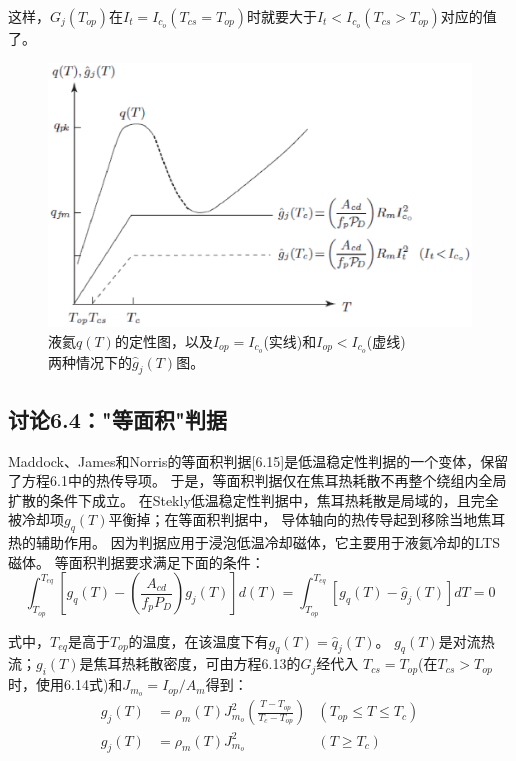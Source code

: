 这样，$G_j(T_{op})$在$I_t=I_{c_o}(T_{cs}=T_{op})$时就要大于$I_t<I_{c_o}(T_{cs}>T_{op})$对应的值了。
\begin{figure}[htbp]
	\centering
	\includegraphics[scale=0.7]{chpt6/figs/fig6.8.eps}
	\caption{液氦$q(T)$的定性图，以及$I_{op}=I_{c_o}$(实线)和$I_{op}<I_{c_o}$(虚线)$两种情况下的$$\hat{g}_j(T)$图。}
\end{figure}


\subsection{讨论6.4："等面积"判据}
Maddock、James和Norris的等面积判据[6.15]是低温稳定性判据的一个变体，保留了方程6.1中的热传导项。
于是，等面积判据仅在焦耳热耗散不再整个绕组内全局扩散的条件下成立。
在Stekly低温稳定性判据中，焦耳热耗散是局域的，且完全被冷却项$g_q(T)$平衡掉；在等面积判据中，
导体轴向的热传导起到移除当地焦耳热的辅助作用。
因为判据应用于浸泡低温冷却磁体，它主要用于液氦冷却的LTS磁体。
等面积判据要求满足下面的条件：
\begin{equation}%
\int_{T_{op}}^{T_{eq}}[g_q(T)-(\frac{A_{cd}}{f_pP_D})g_j(T)]d(T)
=\int_{T_{op}}^{T_{eq}}[g_q(T)-\hat{g}_j(T)]dT=0
\end{equation}

式中，$T_{eq}$是高于$T_{op}$的温度，在该温度下有$g_q(T)=\hat{q}_j(T)$。
$g_q(T)$是对流热流；$g_i(T)$是焦耳热耗散密度，可由方程6.13的$G_j$经代入
$T_{cs}=T_{op}$(在$T_{cs}>T_{op}$时，使用6.14式)和$J_{m_o}=I_{op}/A_m$得到：
\begin{subequations}
	\begin{align}
	g_j(T)&=\rho_m(T)J_{m_o}^2(\frac{T-T_{op}}{T_c-T_{op}}) &(T_{op}\leq T \leq T_c)\\
	g_j(T)&=\rho_m(T)J_{m_o}^2 &(T \geq T_c)
	\end{align}
\end{subequations}

